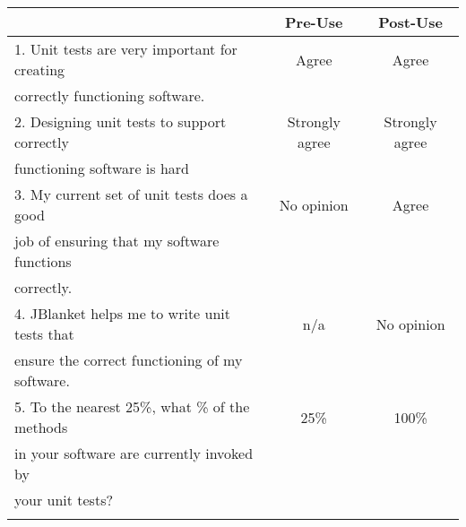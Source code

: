 \begin{tabular}{lcc} \\
 & {\bf Pre-Use} & {\bf Post-Use} \\ \hline
1. Unit tests are very important for creating & Agree & Agree \\
   correctly functioning software. \\ \hline

2. Designing unit tests to support correctly & Strongly agree & Strongly agree \\
   functioning software is hard\\ \hline

3. My current set of unit tests does a good & No opinion & Agree \\
   job of ensuring that my software functions \\
   correctly.\\ \hline

4. JBlanket helps me to write unit tests that & n/a & No opinion \\
   ensure the correct functioning of my software.\\ \hline

5. To the nearest 25\%, what \% of the methods & 25\% & 100\% \\
   in your software are currently invoked by \\
   your unit tests?\\ \hline
\\
\end{tabular}

